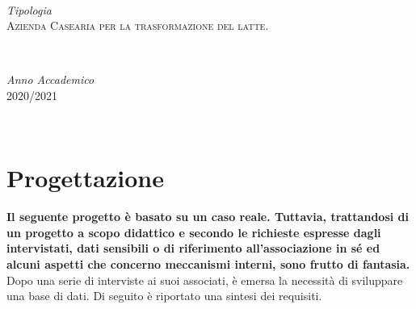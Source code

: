 \documentclass[12pt]{report}
\begin{document}
\begin{titlepage}
\begin{center}
\hrulefill \\[3.0mm]

\begin{minipage}{0.4\textwidth}
	\begin{flushleft}
		\large
		\textit{Tipologia}\\
		\textsc{Azienda Casearia per la trasformazione del latte.} \\ %
	\end{flushleft}
\end{minipage}
~
\begin{minipage}{0.4\textwidth}
	\begin{flushright}
		\large
		\textit{Anno Accademico}\\
		\textsc{2020/2021}\\[3.0mm] %
	\end{flushright}	
\end{minipage} \\[3.0mm]


\end{center}
\end{titlepage}

\tableofcontents
\listoffigures
\lstlistoflistings

\chapter{Progettazione}

\textbf{Il seguente progetto è basato su un caso reale. Tuttavia, trattandosi di un progetto a scopo didattico e secondo le richieste espresse dagli intervistati, dati sensibili o di riferimento all'associazione in sé ed alcuni aspetti che concerno meccanismi interni, sono frutto di fantasia.} \\[0.5cm]
Dopo una serie di interviste ai suoi associati, è emersa la necessità di sviluppare una base di dati. Di seguito è riportato una sintesi dei requisiti.
\end{document}

